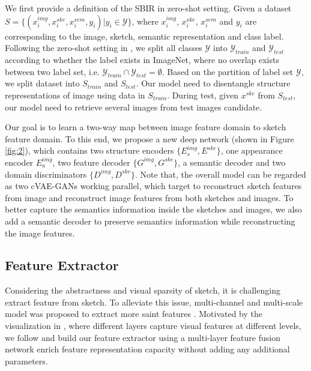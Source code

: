 \documentclass[10pt,twocolumn,letterpaper]{article}
\begin{document}
We first provide a definition of the SBIR in zero-shot setting. Given a dataset $S=\{(x_i^{img}, x_i^{ske}, x_i^{sem}, y_i)|y_i \in \mathcal{Y}\}$, where $x_i^{img}$, $x_i^{ske}$, $x_i^{sem}$ and $y_i$ are corresponding to the image, sketch, semantic representation and class label. Following the zero-shot setting in \cite{yelamarthi2018zero}, we split all classes $\mathcal{Y}$ into $\mathcal{Y}_{train}$ and $\mathcal{Y}_{test}$ according to whether the label exists in ImageNet\cite{deng2009imagenet}, where no overlap exists between two label set, i.e. $\mathcal{Y}_{train} \cap \mathcal{Y}_{test} = \emptyset$. Based on the partition of label set $\mathcal{Y}$, we split dataset into $S_{train}$ and $S_{test}$. Our model need to disentangle structure representations of image using data in $S_{train}$. During test, given $x^{ske}$ from $S_{test}$, our model need to retrieve several images from test images candidate.

Our goal is to learn a two-way map between image feature domain to sketch feature domain. To this end, we propose a new deep network (shown in Figure \ref{fig:2}), which contains two structure encoders $\{E_{s}^{img}, E^{ske}\}$, one appearance encoder $E^{img}_{a}$, two feature decoder $\{G^{img}, G^{ske}\}$, a semantic decoder and two domain discriminators $\{D^{img}, D^{ske}\}$. Note that, the overall model can be regarded as two cVAE-GANs working parallel, which target to reconstruct sketch features from image and reconstruct image features from both sketches and images. To better capture the semantics information inside the sketches and images, we also add a semantic decoder to preserve semantics information while reconstructing the image features.


\subsection{Feature Extractor} \label{3.2}
Considering the abstractness and visual sparsity of sketch, it is challenging extract feature from sketch. To alleviate this issue, multi-channel and multi-scale model was proposed to extract more saint features \cite{yu2017sketch}. Motivated by the visualization in \cite{zeiler2014visualizing}, where different layers capture visual features at different levels, we follow \cite{} and build our feature extractor using a multi-layer feature fusion network enrich feature representation capacity without adding any additional parameters.
\end{document}
